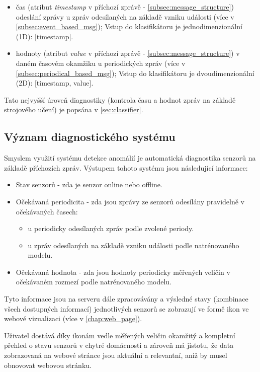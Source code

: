 \begin{itemize}
	\item čas (atribut \textit{timestamp} v příchozí zprávě - \cref{subsec:message_structure}) odeslání zprávy u zpráv odesílaných na základě vzniku události (více v \cref{subsec:event_based_msg}); Vstup do klasifikátoru je jednodimenzionální (1D): [timestamp].
	\item hodnoty (atribut \textit{value} v příchozí zprávě - \cref{subsec:message_structure}) v daném časovém okamžiku u periodických zpráv (více v \cref{subsec:periodical_based_msg}); Vstup do klasifikátoru je dvoudimenzionální (2D): [timestamp, value].
\end{itemize}

Tato nejvyšší úroveň diagnostiky (kontrola času a hodnot zpráv na základě strojového učení) je popsána v \cref{sec:classifier}. 

\subsection*{Význam diagnostického systému}
Smyslem využití systému detekce anomálií je automatická diagnostika senzorů na základě příchozích zpráv. Výstupem tohoto systému jsou následující informace:

\begin{itemize}
 	\item Stav senzorů - zda je senzor online nebo offline. 
	\item Očekávaná periodicita - zda jsou zprávy ze senzorů odesílány pravidelně v očekávaných časech:
	\begin{itemize}
		\item u periodicky odesílaných zpráv podle zvolené periody.
		\item u zpráv odesílaných na základě vzniku události podle natrénovaného modelu.
	\end{itemize}
	\item Očekávaná hodnota - zda jsou hodnoty periodicky měřených veličin v očekávaném rozmezí podle natrénovaného modelu.
\end{itemize}

Tyto informace jsou na serveru dále zpracovávány a výsledné stavy (kombinace všech dostupných informací) jednotlivých senzorů se zobrazují ve formě ikon ve webové vizualizaci (více v \cref{chap:web_page}). \par
Uživatel dostává díky ikonám vedle měřených veličin okamžitý a kompletní přehled o stavu senzorů v chytré domácnosti a zároveň má jistotu, že data zobrazovaná na webové stránce jsou aktuální a relevantní, aniž by musel obnovovat webovou stránku.

